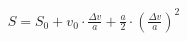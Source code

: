 \documentclass[preview]{standalone}
\begin{document}
\begin{align*}
S = S_{0} + v_{0} \cdot \frac{\Delta v}{a} + \frac{a}{2} \cdot (\frac{\Delta v}{a})^2
\end{align*}
\end{document}
